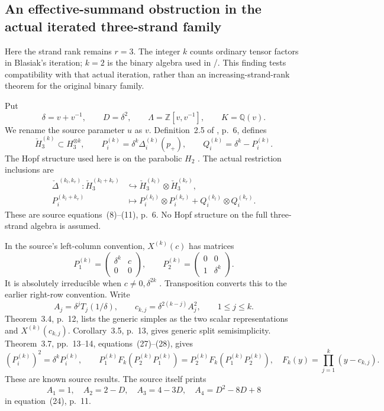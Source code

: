 \subsection{An effective-summand obstruction in the actual iterated three-strand family}

Here the strand rank remains \(r=3\). The integer \(k\) counts
ordinary tensor factors in Blasiak's iteration; \(k=2\) is the
binary algebra used in /. This finding tests
compatibility with that actual iteration, rather than an
increasing-strand-rank theorem for the original binary family.

Put
\[
 \delta=v+v^{-1},\qquad D=\delta^2,\qquad
 \Lambda=\mathbb Z[v,v^{-1}],\qquad K=\mathbb Q(v).
\]
We rename the source parameter \(u\) as \(v\).
Definition~2.5 of \cite{BlasiakChebyshev}, p.~6, defines
\[
 \check H_3^{(k)}\subset H_3^{\otimes k},\qquad
 P_i^{(k)}=\delta^k\Delta_i^{(k)}(p_+),\qquad
 Q_i^{(k)}=\delta^k-P_i^{(k)}.
\]
The Hopf structure used here is on the parabolic \(H_2\)
\cite[Proposition~2.3, pp.~4--5]{BlasiakChebyshev}.
The actual restriction inclusions are
\begin{equation}\label{eq:iteratedActualCoproduct}
 \begin{split}
 \check\Delta^{(k_l,k_r)}:\check H_3^{(k_l+k_r)}
     &\hookrightarrow
       \check H_3^{(k_l)}\otimes\check H_3^{(k_r)},\\
 P_i^{(k_l+k_r)}
     &\longmapsto P_i^{(k_l)}\otimes P_i^{(k_r)}
                   +Q_i^{(k_l)}\otimes Q_i^{(k_r)}.
 \end{split}
\end{equation}
These are source equations~(8)--(11), p.~6. No Hopf structure
on the full three-strand algebra is assumed.

In the source's left-column convention,
\(X^{(k)}(c)\) has matrices
\begin{equation}\label{eq:iteratedSourceSimple}
 P_1^{(k)}=\begin{pmatrix}\delta^k&c\\0&0\end{pmatrix},
 \qquad
 P_2^{(k)}=\begin{pmatrix}0&0\\1&\delta^k\end{pmatrix}.
\end{equation}
It is absolutely irreducible when \(c\ne0,\delta^{2k}\)
\cite[\S3.1, equations~(13)--(14), pp.~8--9]{BlasiakChebyshev}.
Transposition converts this to the earlier right-row convention.
Write
\[
 A_j=\delta^jT_j(1/\delta),\qquad
 c_{k,j}=\delta^{2(k-j)}A_j^2,\qquad 1\le j\le k.
\]
Theorem~3.4, p.~12, lists the generic simples as the two
scalar representations and \(X^{(k)}(c_{k,j})\).
Corollary~3.5, p.~13, gives generic split semisimplicity.
Theorem~3.7, pp.~13--14, equations~(27)--(28), gives
\[
 (P_i^{(k)})^2=\delta^kP_i^{(k)},\qquad
 P_1^{(k)}F_k(P_2^{(k)}P_1^{(k)})
 =P_2^{(k)}F_k(P_1^{(k)}P_2^{(k)}),
 \quad F_k(y)=\prod_{j=1}^k(y-c_{k,j}).
\]
These are known source results. The source itself prints
\begin{equation}\label{eq:iteratedChebyshevParameters}
 A_1=1,\quad A_2=2-D,\quad A_3=4-3D,\quad
 A_4=D^2-8D+8
\end{equation}
in equation~(24), p.~11.

